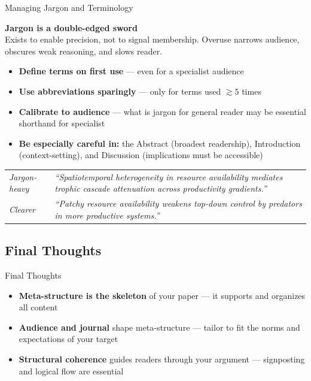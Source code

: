 \documentclass{beamer}
\begin{document}
\begin{frame}{Managing Jargon and Terminology}

  \footnotesize
  \textbf{Jargon is a double-edged sword} \\
  Exists to enable precision, not to signal membership. 
  Overuse narrows audience, obscures weak reasoning,
  and slows reader.

  \medskip
  \begin{itemize}
    \item \textbf{Define terms on first use} --- even for a
      specialist audience
    \item \textbf{Use abbreviations sparingly} --- only
      for terms used $\gtrsim 5$ times
    \item \textbf{Calibrate to audience} --- what is jargon
      for general reader may be essential shorthand for
      specialist
    \item \textbf{Be especially careful in:} the Abstract (broadest
      readership), Introduction (context-setting), and Discussion
      (implications must be accessible)
  \end{itemize}

  \medskip
  {\scriptsize
  \begin{tabular}{@{}lp{7.5cm}@{}}
    \hline
    \textit{Jargon-heavy} & \textit{``Spatiotemporal heterogeneity
      in resource availability mediates trophic cascade attenuation
      across productivity gradients.''} \\
    \textit{Clearer} & \textit{``Patchy resource availability weakens
      top-down control by predators in more productive systems.''} \\
    \hline
  \end{tabular}
  }

\end{frame}

\subsection{Final Thoughts}
\begin{frame}{Final Thoughts}

  \begin{itemize}
    \item \textbf{Meta-structure is the skeleton} of your paper ---
      it supports and organizes all content
    \item \textbf{Audience and journal} shape meta-structure ---
      tailor to fit the norms and expectations of your target
    \item \textbf{Structural coherence} guides readers through your
      argument --- signposting and logical flow are essential
  \end{itemize}
\end{frame}
\end{document}
